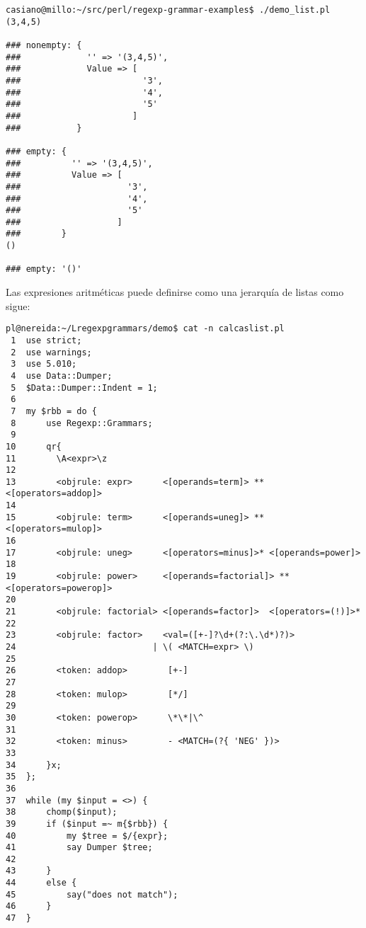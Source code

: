 \begin{verbatim}
casiano@millo:~/src/perl/regexp-grammar-examples$ ./demo_list.pl
(3,4,5)

### nonempty: {
###             '' => '(3,4,5)',
###             Value => [
###                        '3',
###                        '4',
###                        '5'
###                      ]
###           }

### empty: {
###          '' => '(3,4,5)',
###          Value => [
###                     '3',
###                     '4',
###                     '5'
###                   ]
###        }
()

### empty: '()'
\end{verbatim}


Las expresiones aritméticas
puede definirse como una jerarquía de listas como
sigue:

\begin{verbatim}
pl@nereida:~/Lregexpgrammars/demo$ cat -n calcaslist.pl
 1  use strict;
 2  use warnings;
 3  use 5.010;
 4  use Data::Dumper;
 5  $Data::Dumper::Indent = 1;
 6
 7  my $rbb = do {
 8      use Regexp::Grammars;
 9
10      qr{
11        \A<expr>\z
12
13        <objrule: expr>      <[operands=term]> ** <[operators=addop]>
14
15        <objrule: term>      <[operands=uneg]> ** <[operators=mulop]>
16
17        <objrule: uneg>      <[operators=minus]>* <[operands=power]>
18
19        <objrule: power>     <[operands=factorial]> ** <[operators=powerop]>
20
21        <objrule: factorial> <[operands=factor]>  <[operators=(!)]>*
22
23        <objrule: factor>    <val=([+-]?\d+(?:\.\d*)?)>
24                           | \( <MATCH=expr> \)
25
26        <token: addop>        [+-]
27
28        <token: mulop>        [*/]
29
30        <token: powerop>      \*\*|\^
31
32        <token: minus>        - <MATCH=(?{ 'NEG' })>
33
34      }x;
35  };
36
37  while (my $input = <>) {
38      chomp($input);
39      if ($input =~ m{$rbb}) {
40          my $tree = $/{expr};
41          say Dumper $tree;
42
43      }
44      else {
45          say("does not match");
46      }
47  }
\end{verbatim}

